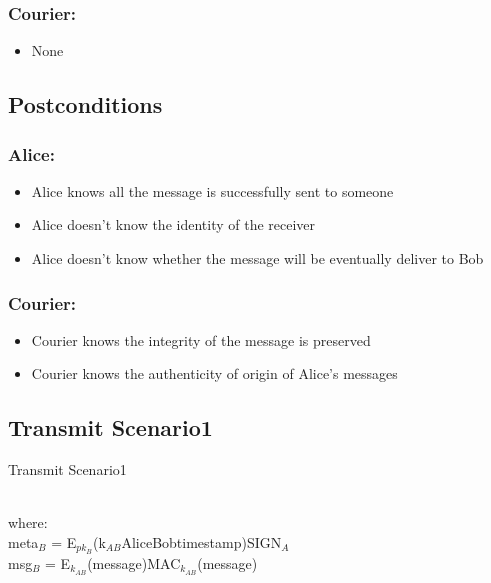 \documentclass{article}
\begin{document}
\subsubsection*{Courier:}
\begin{itemize}
\item None
\end{itemize}

\subsection*{Postconditions}
\subsubsection*{Alice:}
\begin{itemize}
\item Alice knows all the message is successfully sent to someone
\item Alice doesn't know the identity of the receiver
\item Alice doesn't know whether the message will be eventually deliver to Bob
\end{itemize}

\subsubsection*{Courier:}
\begin{itemize}
\item Courier knows the integrity of the message is preserved
\item Courier knows the authenticity of origin of Alice's messages
\end{itemize}
\vspace{20pt}


\subsection*{Transmit Scenario1}
\begin{msc}{Transmit Scenario1}
\setlength{\instdist}{3\instdist}
\setlength{\envinstdist}{2\envinstdist}
\setlength{\levelheight}{1.5\levelheight}

\nextlevel
{}
\nextlevel[2]
\nextlevel
{}
\nextlevel
{}
\nextlevel[2]
\end{msc}
\\
where: \\
meta$_B$ = E$_{pk_B}$(k$_{AB}$\textbar Alice\textbar Bob\textbar timestamp)\textbar SIGN$_A$\\
msg$_B$ = E$_{k_{AB}}$(message)\textbar MAC$_{k_{AB}}$(message)
\end{document}
